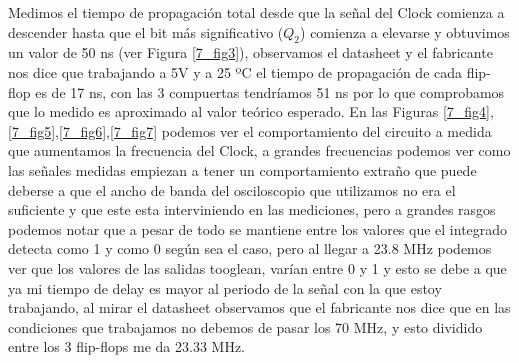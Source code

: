 Medimos el tiempo de propagaci\'on total desde que la señal del Clock comienza a descender hasta que el bit m\'as significativo ($Q_2$) comienza a elevarse y obtuvimos un valor de 50 ns (ver Figura \ref{7_fig3}), observamos el datasheet y el fabricante nos dice que trabajando a 5V y a 25 ºC el tiempo de propagaci\'on de cada flip-flop es de 17 ns, con las 3 compuertas tendríamos 51 ns por lo que comprobamos que lo medido es aproximado al valor te\'orico esperado. En las Figuras \ref{7_fig4},\ref{7_fig5},\ref{7_fig6},\ref{7_fig7} podemos ver el comportamiento del circuito a medida que aumentamos la frecuencia del Clock, a grandes frecuencias podemos ver como las señales medidas empiezan a tener un comportamiento extraño que puede deberse a que el ancho de banda del osciloscopio que utilizamos no era el suficiente y que este esta interviniendo en las mediciones, pero a grandes rasgos podemos notar que a pesar de todo se mantiene entre los valores que el integrado detecta como 1 y como 0 según sea el caso, pero al llegar a 23.8 MHz podemos ver que los valores de las salidas tooglean, varían entre 0 y 1 y esto se debe a que ya mi tiempo de delay es mayor al periodo de la señal con la que estoy trabajando, al mirar el datasheet observamos que el fabricante nos dice que en las condiciones que trabajamos no debemos de pasar los 70 MHz, y esto dividido entre los 3 flip-flops me da 23.33 MHz.



